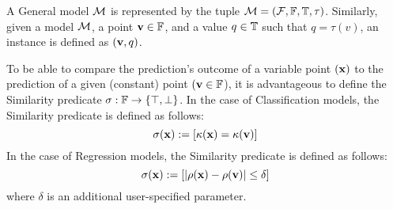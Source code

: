 A General model ${\mathcal{M}}$ is represented by the tuple ${\mathcal{M}}=({\mathcal{F}}, \mathbb{F}, \mathbb{T}, \tau)$.
%
Similarly, given a model ${\mathcal{M}}$, a point $\mathbf{v}\in\mathbb{F}$, and a value $q\in\mathbb{T}$ such that $q=\tau(v)$, an instance is defined as $(\mathbf{v},q)$.


To be able to compare the prediction's outcome of a variable point $(\mathbf{x})$ to the prediction of a given (constant) point $(\mathbf{v}\in\mathbb{F}$), it is advantageous to define the Similarity predicate $\sigma:\mathbb{F}\to\{\top, \bot\}$.
%
In the case of Classification models, the Similarity predicate is defined as follows:
%
$$
\sigma(\mathbf{x}):=[\kappa(\mathbf{x}) = \kappa(\mathbf{v})]
$$
%
In the case of Regression models, the Similarity predicate is defined as follows:
%
$$
\sigma(\mathbf{x}):=[|\rho(\mathbf{x}) - \rho(\mathbf{v})| \leq \delta]
$$
%
where $\delta$ is an additional user-specified parameter.

